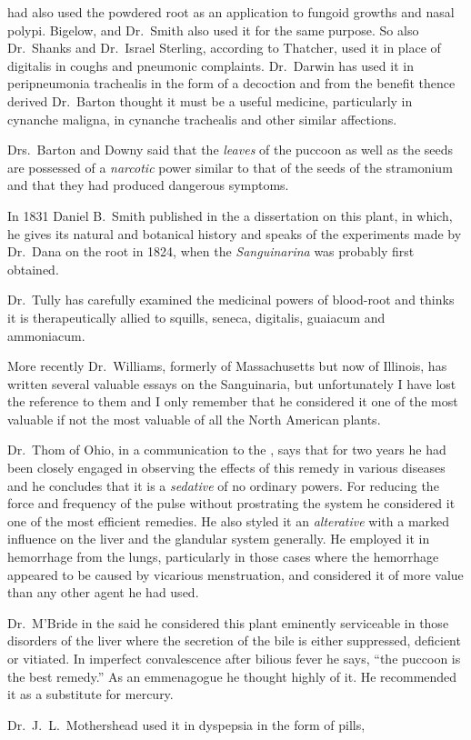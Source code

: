 had also used the powdered root as an application to fungoid growths
and nasal polypi. Bigelow, and Dr.\ Smith also used it for the same
purpose. So also Dr.\ Shanks and Dr.\ Israel Sterling, according to
Thatcher, used it in place of digitalis in coughs and pneumonic complaints.
Dr.\ Darwin has used it in peripneumonia trachealis in the
form of a decoction and from the benefit thence derived Dr.\ Barton
thought it must be a useful medicine, particularly in cynanche maligna,
in cynanche trachealis and other similar affections.

Drs.\ Barton and Downy said that the \emph{leaves} of the puccoon as well as
the seeds are possessed of a \emph{narcotic} power similar to that of the seeds
of the stramonium and that they had produced dangerous symptoms.

In 1831 Daniel B.\ Smith published in the  a dissertation on this plant, in which,
he gives its natural and botanical history and speaks of the experiments
made by Dr.\ Dana on the root in 1824, when the \emph{Sanguinarina} was
probably first obtained.

Dr.\ Tully has carefully examined the medicinal powers of blood-root
and thinks it is therapeutically allied to squills, seneca, digitalis, guaiacum
and ammoniacum.

More recently Dr.\ Williams, formerly of Massachusetts but now of
Illinois, has written several valuable essays on the Sanguinaria, but
unfortunately I have lost the reference to them and I only remember
that he considered it one of the most valuable if not the most valuable
of all the North American plants.

Dr.\ Thom of Ohio, in a communication to the ,
says that for two years he had been closely engaged in observing the
effects of this remedy in various diseases and he concludes that it is a
\emph{sedative} of no ordinary powers. For reducing the force and frequency
of the pulse without prostrating the system he considered it one of the
most efficient remedies. He also styled it an \emph{alterative} with a marked
influence on the liver and the glandular system generally. He employed
it in hemorrhage from the lungs, particularly in those cases where
the hemorrhage appeared to be caused by vicarious menstruation, and
considered it of more value than any other agent he had used.

Dr.\ M'Bride in the  said he considered this
plant eminently serviceable in those disorders of the liver where the
secretion of the bile is either suppressed, deficient or vitiated. In imperfect
convalescence after bilious fever he says, ``the puccoon is the
best remedy.'' As an emmenagogue he thought highly of it. He
recommended it as a substitute for mercury.

Dr.\ J.\ L.\ Mothershead used it in dyspepsia in the form of pills,\endinput
